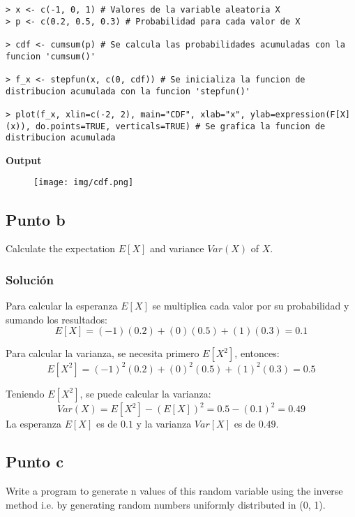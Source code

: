 \documentclass[12pt]{article}
\begin{document}
\begin{lstlisting}
> x <- c(-1, 0, 1) # Valores de la variable aleatoria X
> p <- c(0.2, 0.5, 0.3) # Probabilidad para cada valor de X

> cdf <- cumsum(p) # Se calcula las probabilidades acumuladas con la funcion 'cumsum()'

> f_x <- stepfun(x, c(0, cdf)) # Se inicializa la funcion de distribucion acumulada con la funcion 'stepfun()'

> plot(f_x, xlin=c(-2, 2), main="CDF", xlab="x", ylab=expression(F[X](x)), do.points=TRUE, verticals=TRUE) # Se grafica la funcion de distribucion acumulada
\end{lstlisting}


\textbf{Output}

\begin{figure}[h]
    \centering
    \texttt{[image: img/cdf.png]}
\end{figure}



\subsection{Punto b}

Calculate the expectation $E[X]$ and variance $Var(X)$ of $X$.

\subsubsection{Solución}


Para calcular la esperanza $E[X]$ se multiplica cada valor por su probabilidad y sumando los resultados:
\[E[X] = (-1)(0.2)+(0)(0.5)+(1)(0.3) = 0.1\]

Para calcular la varianza, se necesita primero $E[X^2]$, entonces:
\[E[X^2] = (-1)^2(0.2)+(0)^2(0.5)+(1)^2(0.3) = 0.5\]

Teniendo $E[X^2]$, se puede calcular la varianza:
\[Var(X) = E[X^2] - (E[X])^2 = 0.5-(0.1)^2=0.49\]
La esperanza $E[X]$ es de $0.1$ y la varianza $Var[X]$ es de $0.49$.\newline 




\subsection{Punto c}

Write a program to generate n values of this random variable using the inverse method i.e. by generating random numbers uniformly distributed in (0, 1).
\end{document}
